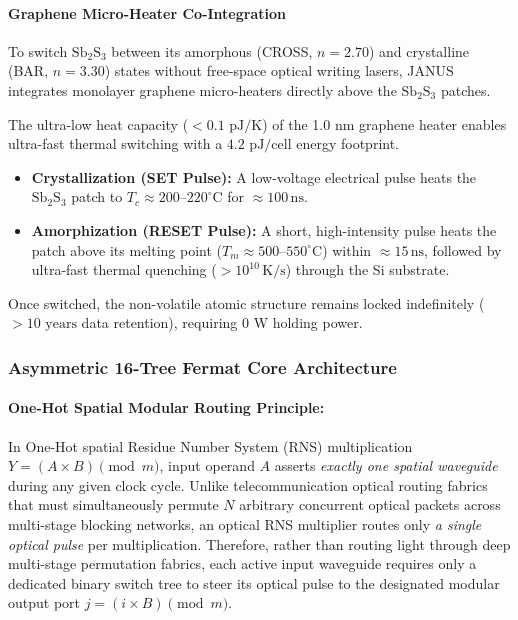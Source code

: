 \documentclass[journal]{IEEEtran}
\begin{document}
\paragraph{\textbf{Graphene Micro-Heater Co-Integration}}
To switch $\mathrm{Sb_2S_3}$ between its amorphous (CROSS, $n=2.70$) and crystalline (BAR, $n=3.30$) states without free-space optical writing lasers, JANUS integrates monolayer graphene micro-heaters directly above the $\mathrm{Sb_2S_3}$ patches.

The ultra-low heat capacity ($< 0.1\text{ pJ/K}$) of the 1.0 nm graphene heater enables ultra-fast thermal switching with a $4.2\text{ pJ/cell}$ energy footprint. 

\begin{itemize}
\item \textbf{Crystallization (SET Pulse):} A low-voltage electrical pulse heats the $\mathrm{Sb_2S_3}$ patch to $T_c \approx 200\text{--}220^\circ\mathrm{C}$ for $\approx 100\,\mathrm{ns}$.
\item \textbf{Amorphization (RESET Pulse):} A short, high-intensity pulse heats the patch above its melting point ($T_m \approx 500\text{--}550^\circ\mathrm{C}$) within $\approx 15\,\mathrm{ns}$, followed by ultra-fast thermal quenching ($> 10^{10}\,\mathrm{K/s}$) through the Si substrate.
\end{itemize}

Once switched, the non-volatile atomic structure remains locked indefinitely ($> 10\text{ years}$ data retention), requiring 0 W holding power.

\subsubsection{\textbf{Asymmetric 16-Tree Fermat Core Architecture}}
\label{sec:16tree_arch}

\paragraph{\textbf{One-Hot Spatial Modular Routing Principle:}}
In One-Hot spatial Residue Number System (RNS) multiplication $Y = (A \times B) \pmod{m}$, input operand $A$ asserts \textit{exactly one spatial waveguide} during any given clock cycle. Unlike telecommunication optical routing fabrics that must simultaneously permute $N$ arbitrary concurrent optical packets across multi-stage blocking networks, an optical RNS multiplier routes only \textit{a single optical pulse} per multiplication. Therefore, rather than routing light through deep multi-stage permutation fabrics, each active input waveguide requires only a dedicated binary switch tree to steer its optical pulse to the designated modular output port $j = (i \times B) \pmod{m}$.
\end{document}
